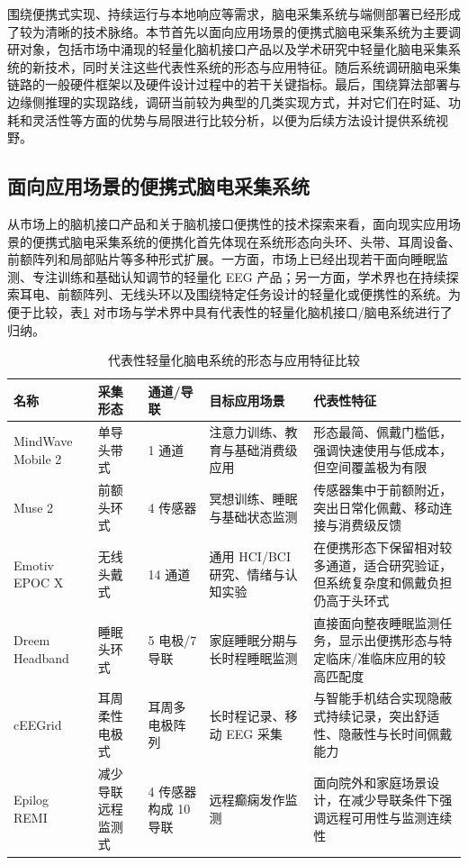 围绕便携式实现、持续运行与本地响应等需求，脑电采集系统与端侧部署已经形成了较为清晰的技术脉络。本节首先以面向应用场景的便携式脑电采集系统为主要调研对象，包括市场中涌现的轻量化脑机接口产品以及学术研究中轻量化脑电采集系统的新技术，同时关注这些代表性系统的形态与应用特征。随后系统调研脑电采集链路的一般硬件框架以及硬件设计过程中的若干关键指标。最后，围绕算法部署与边缘侧推理的实现路线，调研当前较为典型的几类实现方式，并对它们在时延、功耗和灵活性等方面的优势与局限进行比较分析，以便为后续方法设计提供系统视野。

\subsection{面向应用场景的便携式脑电采集系统}

从市场上的脑机接口产品和关于脑机接口便携性的技术探索来看，面向现实应用场景的便携式脑电采集系统的便携化首先体现在系统形态向头环、头带、耳周设备、前额阵列和局部贴片等多种形式扩展。一方面，市场上已经出现若干面向睡眠监测、专注训练和基础认知调节的轻量化 EEG 产品；另一方面，学术界也在持续探索耳电、前额阵列、无线头环以及围绕特定任务设计的轻量化或便携性的系统\cite{He23, Arn20, Deb15, Bio22}。为便于比较，表\ref{tab:c1-portable-eeg} 对市场与学术界中具有代表性的轻量化脑机接口/脑电系统进行了归纳。

\begin{table}[htbp]
\centering
\footnotesize
\caption{代表性轻量化脑电系统的形态与应用特征比较}
\label{tab:c1-portable-eeg}
\setlength{\tabcolsep}{3pt}
\begin{tabular}{p{2.3cm} p{2.3cm} p{1.7cm} p{2.9cm} p{4.0cm}}
\toprule
名称 & 采集形态 & 通道/导联 & 目标应用场景 & 代表性特征 \\
\midrule
MindWave Mobile 2 & 单导头带式 & 1 通道 & 注意力训练、教育与基础消费级应用 & 形态最简、佩戴门槛低，强调快速使用与低成本，但空间覆盖极为有限\cite{He23} \\
\midrule
Muse 2 & 前额头环式 & 4 传感器 & 冥想训练、睡眠与基础状态监测 & 传感器集中于前额附近，突出日常化佩戴、移动连接与消费级反馈\cite{He23} \\
\midrule
Emotiv EPOC X & 无线头戴式 & 14 通道 & 通用 HCI/BCI 研究、情绪与认知实验 & 在便携形态下保留相对较多通道，适合研究验证，但系统复杂度和佩戴负担仍高于头环式\cite{He23} \\
\midrule
Dreem Headband & 睡眠头环式 & 5 电极/7 导联 & 家庭睡眠分期与长时程睡眠监测 & 直接面向整夜睡眠监测任务，显示出便携形态与特定临床/准临床应用的较高匹配度\cite{Arn20} \\
\midrule
cEEGrid & 耳周柔性电极式 & 耳周多电极阵列 & 长时程记录、移动 EEG 采集 & 与智能手机结合实现隐蔽式持续记录，突出舒适性、隐蔽性与长时间佩戴能力\cite{Deb15} \\
\midrule
Epilog REMI & 减少导联远程监测式 & 4 传感器构成 10 导联 & 远程癫痫发作监测 & 面向院外和家庭场景设计，在减少导联条件下强调远程可用性与监测连续性\cite{Fra21b} \\
\bottomrule
\end{tabular}
\end{table}

